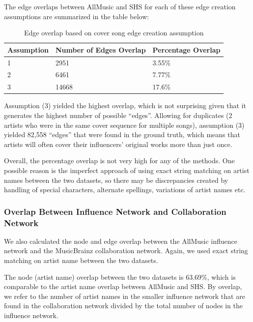 The edge overlaps between AllMusic and SHS for each of these edge creation assumptions are summarized in the table below:

\begin{table}[H]
\centering
\caption{Edge overlap based on cover song edge creation assumption}
\label{my-label}
\begin{tabular}{|l|l|l|}
\hline
Assumption & Number of Edges Overlap & Percentage Overlap \\ \hline
1      & 2951                    & 3.55\%             \\ \hline
2      & 6461                    & 7.77\%             \\ \hline
3      & 14668                   & 17.6\%             \\ \hline
\end{tabular}
\end{table}


Assumption (3) yielded the highest overlap, which is not surprising given that it generates the highest number of possible ``edges''. Allowing for duplicates (2 artists who were in the same cover sequence for multiple songs), assumption (3) yielded 82,558 ``edges'' that were found in the ground truth, which means that artists will often cover their influencers' original works more than just once.

Overall, the percentage overlap is not very high for any of the methods. One possible reason is the imperfect approach of using exact string matching on artist names between the two datasets, so there may be discrepancies created by handling of special characters, alternate spellings, variations of artist names etc.

\subsubsection{Overlap Between Influence Network and Collaboration Network}
We also calculated the node and edge overlap between the AllMusic influence network and the MusicBrainz collaboration network. Again, we used exact string matching on artist name between the two datasets.

The node (artist name) overlap between the two datasets is 63.69\%, which is comparable to the artist name overlap between AllMusic and SHS. By overlap, we refer to the number of artist names in the smaller influence network that are found in the collaboration network divided by the total number of nodes in the influence network.

